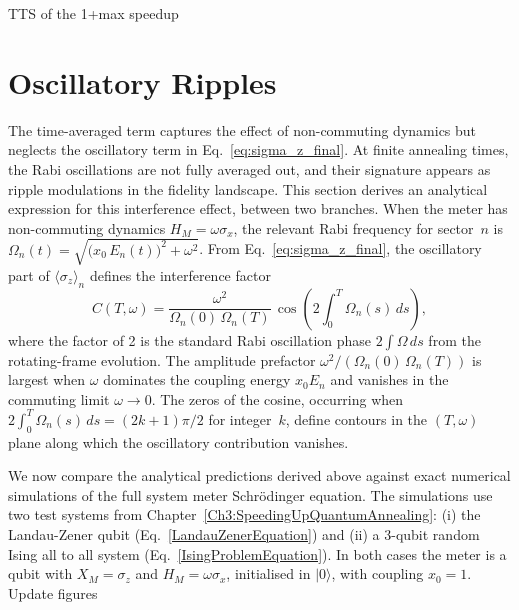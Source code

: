 \color{red} TTS of the 1+max speedup \color{black}

\section{Oscillatory Ripples}\label{sec:interference}

\qquad The time-averaged term captures the effect of non-commuting dynamics but neglects the oscillatory term in Eq.~\eqref{eq:sigma_z_final}. At finite annealing times, the Rabi oscillations are not fully averaged out, and their signature appears as ripple modulations in the fidelity landscape. This section derives an analytical expression for this interference effect, between two branches. When the meter has non-commuting dynamics $H_M = \omega\sigma_x$, the relevant Rabi frequency for sector~$n$ is $\Omega_n(t) = \sqrt{\bigl(x_0\,E_n(t)\bigr)^2 + \omega^2}$. From Eq.~\eqref{eq:sigma_z_final}, the oscillatory part of $\langle\sigma_z\rangle_n$ defines the interference factor
\begin{equation}\label{eq:interference_factor_general}
    C(T, \omega) = \frac{\omega^2}{\Omega_n(0)\,\Omega_n(T)}\,\cos\!\left(2\int_0^T \Omega_n(s)\,ds\right),
\end{equation}
where the factor of 2 is the standard Rabi oscillation phase $2\int\Omega\,ds$ from the rotating-frame evolution. The amplitude prefactor $\omega^2/(\Omega_n(0)\,\Omega_n(T))$ is largest when $\omega$ dominates the coupling energy $x_0 E_n$ and vanishes in the commuting limit $\omega \to 0$. The zeros of the cosine, occurring when $2\int_0^T \Omega_n(s)\,ds = (2k+1)\pi/2$ for integer~$k$, define contours in the $(T, \omega)$ plane along which the oscillatory contribution vanishes.

\qquad We now compare the analytical predictions derived above against exact numerical simulations of the full system meter Schr\"odinger equation. The simulations use two test systems from Chapter~\ref{Ch3:SpeedingUpQuantumAnnealing}: (i) the Landau-Zener qubit (Eq.~\ref{LandauZenerEquation}) and (ii) a 3-qubit random Ising all to all system (Eq.~\ref{IsingProblemEquation}). In both cases the meter is a qubit with $X_M = \sigma_z$ and $H_M = \omega\sigma_x$, initialised in $|0\rangle$, with coupling $x_0 = 1$. \color{red} Update figures \color{black}




